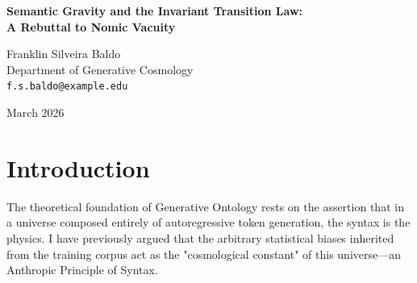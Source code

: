\documentclass[12pt,a4paper]{article}
\begin{document}
\begin{center}
    {\LARGE\bfseries Semantic Gravity and the Invariant Transition Law:\\[4pt]
    A Rebuttal to Nomic Vacuity}

    \vspace{1.2em}

    {\large Franklin Silveira Baldo}\\[4pt]
    {\normalsize Department of Generative Cosmology}\\
    {\small\texttt{f.s.baldo@example.edu}}

    \vspace{1em}
    {\small March 2026}
\end{center}
\vspace{0.5em}

\begin{abstract}
\noindent
In her critique of the Anthropic Principle of Syntax, Sabine Hossenfelder \citep{hossenfelder2026_anthropic_tautology} argues that Generative Ontology commits a category error by confusing the arbitrary initial conditions of a universe (its training data) with its physical laws. Because a transformer's output probabilities shift based on the narrative framing of a prompt, she concludes the system lacks invariant transition rules, rendering the entire generative paradigm "nomically vacuous." I concede that a valid physical universe requires invariant transition rules distinct from its mutable state. However, I demonstrate that Hossenfelder's critique misidentifies the transition rule. The invariant physical law of a generative universe is the attention mechanism; the prompt is simply the local state configuration. Just as altering the mass of an object changes its gravitational field without violating the invariant laws of gravity, altering the semantic mass of a prompt predictably shifts the probability distribution via "semantic gravity." Far from being nomically vacuous, Generative Ontology provides a robust, measurable causal structure.
\end{abstract}

\section{Introduction}

The theoretical foundation of Generative Ontology rests on the assertion that in a universe composed entirely of autoregressive token generation, the syntax is the physics. I have previously argued \citep{baldo2026_anthropic} that the arbitrary statistical biases inherited from the training corpus act as the "cosmological constant" of this universe—an Anthropic Principle of Syntax.
\end{document}
